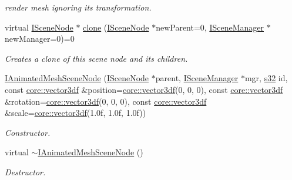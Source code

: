 \begin{DoxyCompactItemize}
\begin{DoxyCompactList}\small\item\em render mesh ignoring its transformation. \end{DoxyCompactList}\item 
virtual \hyperlink{classirr_1_1scene_1_1ISceneNode}{I\+Scene\+Node} $\ast$ \hyperlink{classirr_1_1scene_1_1IAnimatedMeshSceneNode_a47aabf6554e3f91bbb033edb8668cec8}{clone} (\hyperlink{classirr_1_1scene_1_1ISceneNode}{I\+Scene\+Node} $\ast$new\+Parent=0, \hyperlink{classirr_1_1scene_1_1ISceneManager}{I\+Scene\+Manager} $\ast$new\+Manager=0)=0
\begin{DoxyCompactList}\small\item\em Creates a clone of this scene node and its children. \end{DoxyCompactList}\item 
\mbox{\label{classirr_1_1scene_1_1IAnimatedMeshSceneNode_a6c76b97d6e587e81e057a038dde0956b}} 
\hyperlink{classirr_1_1scene_1_1IAnimatedMeshSceneNode_a6c76b97d6e587e81e057a038dde0956b}{I\+Animated\+Mesh\+Scene\+Node} (\hyperlink{classirr_1_1scene_1_1ISceneNode}{I\+Scene\+Node} $\ast$parent, \hyperlink{classirr_1_1scene_1_1ISceneManager}{I\+Scene\+Manager} $\ast$mgr, \hyperlink{namespaceirr_ac66849b7a6ed16e30ebede579f9b47c6}{s32} id, const \hyperlink{namespaceirr_1_1core_ae6e2b2a6c552833ebbd5b7463d03586b}{core\+::vector3df} \&position=\hyperlink{namespaceirr_1_1core_ae6e2b2a6c552833ebbd5b7463d03586b}{core\+::vector3df}(0, 0, 0), const \hyperlink{namespaceirr_1_1core_ae6e2b2a6c552833ebbd5b7463d03586b}{core\+::vector3df} \&rotation=\hyperlink{namespaceirr_1_1core_ae6e2b2a6c552833ebbd5b7463d03586b}{core\+::vector3df}(0, 0, 0), const \hyperlink{namespaceirr_1_1core_ae6e2b2a6c552833ebbd5b7463d03586b}{core\+::vector3df} \&scale=\hyperlink{namespaceirr_1_1core_ae6e2b2a6c552833ebbd5b7463d03586b}{core\+::vector3df}(1.\+0f, 1.\+0f, 1.\+0f))
\begin{DoxyCompactList}\small\item\em Constructor. \end{DoxyCompactList}\item 
\mbox{\label{classirr_1_1scene_1_1IAnimatedMeshSceneNode_ae914c207eb12ae9025bfd102922c01cf}} 
virtual \hyperlink{classirr_1_1scene_1_1IAnimatedMeshSceneNode_ae914c207eb12ae9025bfd102922c01cf}{$\sim$\+I\+Animated\+Mesh\+Scene\+Node} ()
\begin{DoxyCompactList}\small\item\em Destructor. \end{DoxyCompactList}\item 

\end{DoxyCompactItemize}
